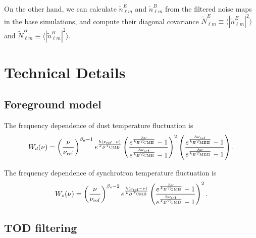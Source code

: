 \documentclass[12pt, a4paper]{ctexart} %
\begin{document}
On the other hand, we can calculate $\tilde{n}_{\ell m}^E$ and $\tilde{n}_{\ell m}^B$ from the filtered noise maps in the base simulations, and compute their diagonal covariance $\tilde{N}^E_{\ell m} \equiv \langle |\tilde{n}_{\ell m}^E|^2\rangle $ and $\tilde{N}^B_{\ell m} \equiv \langle |\tilde{n}_{\ell m}^B|^2\rangle $.



\section{Technical Details}

\subsection{Foreground model}

The frequency dependence of dust temperature fluctuation is
\begin{equation}
  W_d(\nu) = \left(\frac{\nu}{\nu_{\rm ref}}\right)^{\beta_d-1}e^{\frac{h(\nu_{\rm ref} - \nu)}{k_BT_{\rm CMB}}}\left(\frac{e^{\frac{h\nu}{k_BT_{\rm CMB}}}-1}{e^{\frac{h\nu_{\rm ref}}{k_BT_{\rm CMB}}}-1}\right)^2 \left(\frac{e^{\frac{h\nu_{\rm ref}}{k_BT_{\rm MBB}}}-1}{e^{\frac{h\nu}{k_BT_{\rm MBB}}}-1}\right). \label{eq:dust_w}
\end{equation}

The frequency dependence of synchrotron temperature fluctuation is
\begin{equation}
  W_s(\nu) = \left(\frac{\nu}{\nu_{\rm ref}}\right)^{\beta_s-2}e^{\frac{h(\nu_{\rm ref} - \nu)}{k_BT_{\rm CMB}}}\left(\frac{e^{\frac{h\nu}{k_BT_{\rm CMB}}}-1}{e^{\frac{h\nu_{\rm ref}}{k_BT_{\rm CMB}}}-1}\right)^2. \label{eq:sync_w}
\end{equation}

\subsection{TOD filtering}


 
\end{document}
